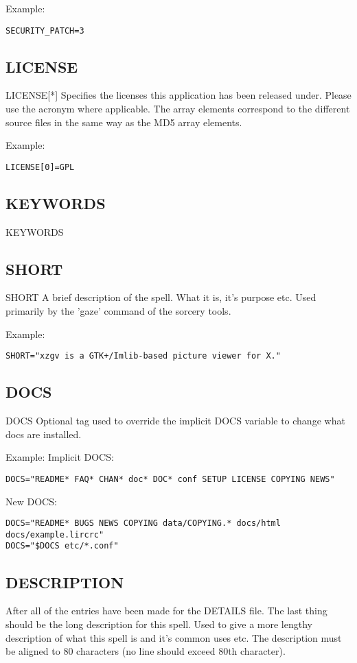 \documentclass[a4paper,10pt]{book}
\begin{document}
Example:
\begin{verbatim}
SECURITY_PATCH=3
\end{verbatim}

\subsection{LICENSE}
LICENSE[*]
	Specifies the licenses this application has been released under.
	Please use the acronym where applicable. The array elements
	correspond to the different source files in the same way as the MD5
	array elements.

Example:
\begin{verbatim}
LICENSE[0]=GPL
\end{verbatim}

\subsection{KEYWORDS}
KEYWORDS

\subsection{SHORT}
SHORT
	A brief description of the spell. What it is, it's purpose etc. Used
	primarily by the 'gaze' command of the sorcery tools.

Example:
\begin{verbatim}
SHORT="xzgv is a GTK+/Imlib-based picture viewer for X."
\end{verbatim}

\subsection{DOCS}
DOCS Optional tag used to override the implicit DOCS variable to change what
docs are installed.

Example:
Implicit DOCS:
\begin{verbatim}
DOCS="README* FAQ* CHAN* doc* DOC* conf SETUP LICENSE COPYING NEWS"
\end{verbatim}

New DOCS:
\begin{verbatim}
DOCS="README* BUGS NEWS COPYING data/COPYING.* docs/html docs/example.lircrc"
DOCS="$DOCS etc/*.conf"
\end{verbatim}

\subsection{DESCRIPTION}
	After all of the entries have been made for the DETAILS file. The
	last thing should be the long description for this spell. Used to
	give a more lengthy description of what this spell is and it's common
	uses etc. The description must be aligned to 80 characters (no line
	should exceed 80th character).
\end{document}
